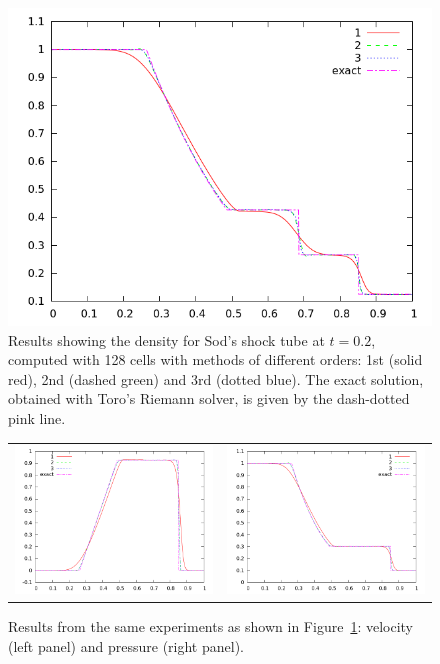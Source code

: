 \documentclass[10pt]{article}
\begin{document}
\begin{figure}[h]
  \begin{center}
    \includegraphics[width=.95\textwidth]{den128comp_20}
  \end{center}
  \caption{Results showing the density for Sod's shock tube at $t=0.2$, computed with 128 cells with methods of different orders: 1st (solid red), 2nd (dashed green) and 3rd (dotted blue). The exact solution, obtained with Toro's Riemann solver, is given by the dash-dotted pink line.}
  \label{fig:den128comp}
\end{figure}

\begin{figure}
  \begin{center}
	\begin{tabular}{cc}
      \includegraphics[width=.475\textwidth]{vel128comp_20} &
	  \includegraphics[width=.475\textwidth]{prs128comp_20}
	\end{tabular}
  \end{center}
  \caption{Results from the same experiments as shown in Figure~\ref{fig:den128comp}:
  velocity (left panel) and pressure (right panel).}
\end{figure}
\end{document}
